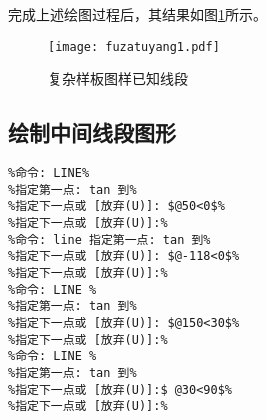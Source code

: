 完成上述绘图过程后，其结果如图\ref{fig:fuzatuyang1}所示。
\begin{figure}[htbp]
\centering
\texttt{[image: fuzatuyang1.pdf]}
\caption{复杂样板图样已知线段}\label{fig:fuzatuyang1}
\end{figure}
\subsection{绘制中间线段图形}
\begin{lstlisting}
%命令: LINE%
%指定第一点: tan 到%
%指定下一点或 [放弃(U)]: $@50<0$%
%指定下一点或 [放弃(U)]:%
%命令: line 指定第一点: tan 到%
%指定下一点或 [放弃(U)]: $@-118<0$%
%指定下一点或 [放弃(U)]:%
%命令: LINE %
%指定第一点: tan 到%
%指定下一点或 [放弃(U)]: $@150<30$%
%指定下一点或 [放弃(U)]:%
%命令: LINE %
%指定第一点: tan 到%
%指定下一点或 [放弃(U)]:$ @30<90$%
%指定下一点或 [放弃(U)]:%
\end{lstlisting}

